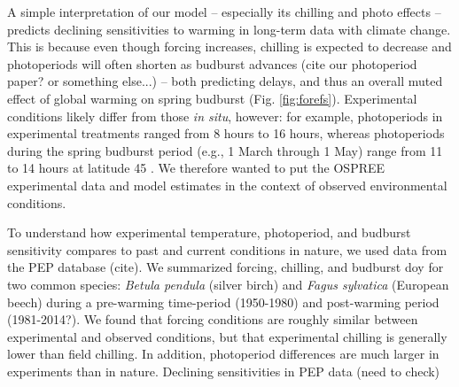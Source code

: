 \documentclass[11pt,letter]{article}
\begin{document}



\par A simple interpretation of our model -- especially its chilling and photo effects -- predicts declining sensitivities to warming in long-term data with climate change. This is because even though forcing increases, chilling is expected to decrease and photoperiods will often shorten as budburst advances (cite our photoperiod paper? or something else...) -- both predicting delays, and thus an overall muted effect of global warming on spring budburst (Fig. \ref{fig:forefs}).  Experimental conditions likely differ from those \emph{in situ}, however:  for example, photoperiods in experimental treatments ranged from 8 hours to 16 hours, whereas photoperiods during the spring budburst period (e.g., 1 March through 1 May) range from 11 to 14 hours at latitude 45 \degree. We therefore wanted to put the OSPREE experimental data and model estimates in the context of observed environmental conditions. 

\par To understand how experimental temperature, photoperiod, and budburst sensitivity compares to past and current conditions in nature, we used data from the PEP database (cite). We summarized forcing, chilling, and budburst doy for two common species: \emph{Betula pendula} (silver birch) and \emph{Fagus sylvatica} (European beech) during a pre-warming time-period (1950-1980) and post-warming period (1981-2014?). We found that forcing conditions are roughly similar between experimental and observed conditions, but that experimental chilling is generally lower than field chilling. In addition, photoperiod differences are much larger in experiments than in nature. Declining sensitivities in PEP data (need to check)
\end{document}
